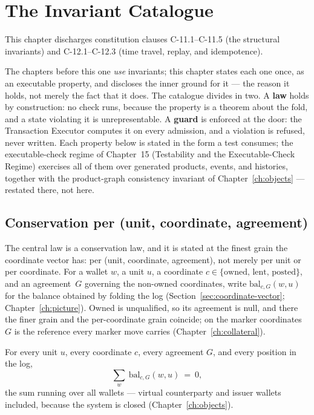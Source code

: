 \section{The Invariant Catalogue}\label{ch:invariants}

This chapter discharges constitution clauses C-11.1--C-11.5 (the structural invariants) and C-12.1--C-12.3 (time travel, replay, and idempotence).

The chapters before this one \emph{use} invariants; this chapter states each one
once, as an executable property, and discloses the inner ground for it --- the
reason it holds, not merely the fact that it does. The catalogue divides in two.
A \textbf{law} holds by construction: no check runs, because the property is a
theorem about the fold, and a state violating it is unrepresentable. A
\textbf{guard} is enforced at the door: the Transaction Executor computes it on
every admission, and a violation is refused, never written. Each property below
is stated in the form a test consumes; the executable-check regime of Chapter~15
(Testability and the Executable-Check Regime) exercises all of them over
generated products, events, and histories, together with the product-graph
consistency invariant of Chapter~\ref{ch:objects} --- restated there, not here.

\subsection{Conservation per (unit, coordinate, agreement)}

The central law is a conservation law, and it is stated at the finest grain the coordinate
vector has: per (unit, coordinate, agreement), not merely per unit or per coordinate. For a
wallet $w$, a unit $u$, a coordinate $c\in\{\text{owned, lent, posted}\}$, and an
agreement~$G$ governing the non-owned coordinates, write $\mathrm{bal}_{c,G}(w,u)$ for the
balance obtained by folding the log (Section~\ref{sec:coordinate-vector};
Chapter~\ref{ch:picture}). Owned is unqualified, so its agreement is null, and there the
finer grain and the per-coordinate grain coincide; on the marker coordinates $G$ is the
reference every marker move carries (Chapter~\ref{ch:collateral}).

\begin{theorem}[Conservation]\label{thm:conservation}
For every unit $u$, every coordinate $c$, every agreement $G$, and every position in the
log,
\[
\sum_{w}\ \mathrm{bal}_{c,G}(w,u)\ =\ 0,
\]
the sum running over all wallets --- virtual counterparty and issuer wallets
included, because the system is closed (Chapter~\ref{ch:objects}).
\end{theorem}

